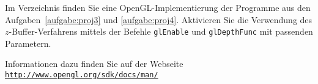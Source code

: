 %
Im Verzeichnis  finden Sie eine 
OpenGL-Implementierung der Programme aus 
den Aufgaben~\ref{aufgabe:proj3} und \ref{aufgabe:proj4}. Aktivieren Sie
die Verwendung des $z$-Buffer-Ver\-fah\-rens mittels der Befehle 
\texttt{glEnable} und \texttt{glDepthFunc} mit passenden Parametern.

Informationen dazu finden Sie auf der Webseite\\
\href{http://www.opengl.org/sdk/docs/man/}{\texttt{http://www.opengl.org/sdk/docs/man/}}
